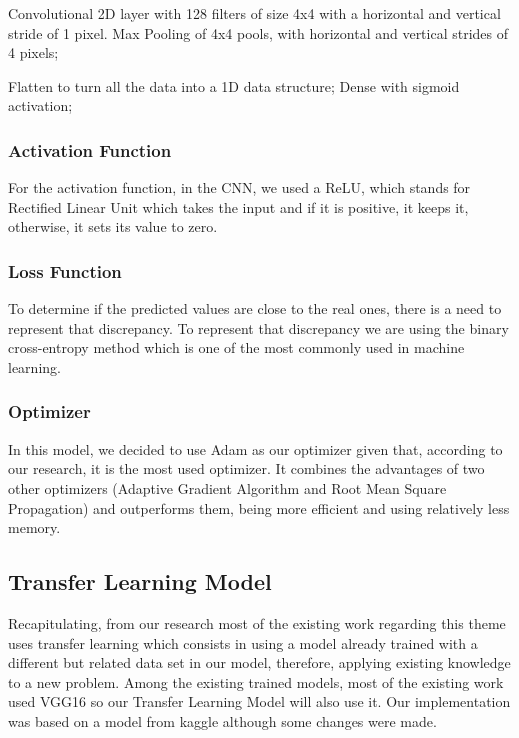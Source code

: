 \documentclass[conference]{IEEEtran}
\begin{document}
  Convolutional 2D layer with 128 filters of size 4x4 with a horizontal and vertical stride of 1 pixel.
  Max Pooling of 4x4 pools, with horizontal and vertical strides of 4 pixels;
  
  Flatten to turn all the data into a 1D data structure;
  Dense with sigmoid activation;

\subsubsection{Activation Function}
For the activation function, in the CNN, we used a ReLU, which stands for Rectified Linear Unit which takes the input and if it is positive, it keeps it, otherwise, it sets its value to zero.\\

\subsubsection{Loss Function}
To determine if the predicted values are close to the real ones, there is a need to represent that discrepancy. To represent that discrepancy we are using the binary cross-entropy method which is one of the most commonly used in machine learning.\\

\subsubsection{Optimizer}
In this model, we decided to use Adam as our optimizer given that, according to our research, it is the most used optimizer. It combines the advantages of two other optimizers (Adaptive Gradient Algorithm and Root Mean Square Propagation) and outperforms them, being more efficient and using relatively less memory.\cite{b6}\\

\subsection{Transfer Learning Model}

Recapitulating, from our research most of the existing work regarding this theme uses transfer learning which consists in using a model already trained with a different but related data set in our model, therefore, applying existing knowledge to a new problem. Among the existing trained models, most of the existing work used VGG16 so our Transfer Learning Model will also use it. Our implementation was based on a model from kaggle\cite{b3} although some changes were made.
\end{document}
